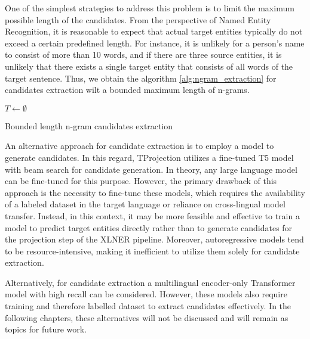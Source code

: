 One of the simplest strategies to address this problem is to limit the maximum
possible length of the candidates. From the perspective of Named Entity Recognition,
it is reasonable to expect that actual target entities typically do not exceed a
certain predefined length. For instance, it is unlikely for a person's name to consist
of more than 10 words, and if there are three source entities, it is unlikely
that there exists a single target entity that consists of all words of the target
sentence. Thus, we obtain the algorithm \ref{alg:ngram_extraction} for candidates extraction wilt a
bounded maximum length of n-grams.

\begin{algorithm}

  \( T \gets \emptyset \) \;
  \caption{Bounded length n-gram candidates extraction}
  \label{alg:ngram_extraction}
\end{algorithm}

An alternative approach for candidate extraction is to employ a model to generate
candidates. In this regard, TProjection \cite{garcia-ferrero-etal-2023-projection} utilizes a fine-tuned T5 model with beam
search for candidate generation. In theory, any large language model can be
fine-tuned for this purpose. However, the primary drawback of this approach is the necessity
to fine-tune these models, which requires the availability of a labeled dataset in the target
language or reliance on cross-lingual model transfer. Instead, in this context,
it may be more feasible and effective to train a model to predict target
entities directly rather than to generate candidates for the projection step of the
XLNER pipeline. Moreover, autoregressive models tend to be resource-intensive,
making it inefficient to utilize them solely for candidate extraction.

Alternatively, for candidate extraction a multilingual encoder-only Transformer \cite{vaswani2017attention}
model with high recall can be considered. However, these models also require training and therefore labelled dataset
to extract candidates effectively. In the following chapters, these alternatives will not be discussed
and will remain as topics for future work.

